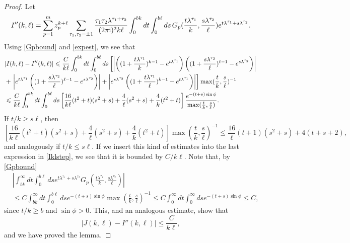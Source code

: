\documentclass{article}
\numberwithin{equation}{section}
\numberwithin{figure}{section}
\theoremstyle{plain}
\theoremstyle{plain}
\numberwithin{thm}{section}
\theoremstyle{remark}
\newcommand{\I}{{\rm i}}
\let \le \leqslant
\let \ge \geqslant
\begin{document}
\begin{proof}
Let
\begin{equation*}
I''(k,\ell)=\sum_{p=1}^m z_p^{k+\ell}\sum_{\tau_1,\tau_2=\pm 1}\frac{\tau_1\tau_2\lambda^{\tau_1+\tau_2}}{(2\pi\I)^2k\ell}\int_0^{bk}dt\int_0^{b\ell}ds\,
G_p(\frac {t\lambda^{\tau_1}}k,\frac {s\lambda^{\tau_2}}\ell)e^{t\lambda^{\tau_1}+s\lambda^{\tau_2}}.
\end{equation*}
Using \eqref{Gpbound} and \eqref{expest}, we see that
\begin{align}\label{Iklstep}
&|I(k,\ell)-I''(k,\ell)|\le\frac{C}{k\ell}\int_0^{bk}dt\int_0^{b\ell}ds\left[\left|\left((1+\frac {t\lambda^{\tau_1}}k)^{k-1}-e^{t\lambda^{\tau_1}}\right)
\left((1+\frac {s\lambda^{\tau_2}}\ell)^{\ell-1}-e^{s\lambda^{\tau_2}}\right)\right|\right.\notag\\
&+\left.\left|e^{t\lambda^{\tau_1}}\left((1+\frac {s\lambda^{\tau_2}}\ell)^{\ell-1}-e^{s\lambda^{\tau_2}}\right)\right|
+\left|e^{s\lambda^{\tau_2}}\left((1+\frac {t\lambda^{\tau_1}}\ell)^{k-1}-e^{t\lambda^{\tau_1}}\right)\right|\right]\max(\frac tk,\frac s\ell)^{-1}\notag\\
&\le\frac{C}{k\ell}\int_0^{bk}dt\int_0^{b\ell}ds\left[\frac {16}{k\ell}(t^2+t)(s^2+s)+\frac 4\ell(s^2+s)+\frac 4k(t^2+t)\right]\frac{e^{-(t+s)\sin\phi}}{\max(\frac tk,\frac s\ell)}.
\end{align}
If $t/k\ge s\ell$, then
\begin{equation*}
\left[\frac {16}{k\ell}(t^2+t)(s^2+s)+\frac 4\ell(s^2+s)+\frac 4k(t^2+t)\right]\max(\frac tk,\frac s\ell)^{-1}\le \frac {16}\ell(t+1)(s^2+s)+4(t+s+2),
\end{equation*}
and analogously if $t/k\le s\ell$. If we insert this kind of estimates into the last expression in \eqref{Iklstep}, we see that it is bounded by $C/k\ell$. Note that, by \eqref{Gpbound}
\begin{align*}
&\left|\int_{bk}^\infty dt\int_0^{b\ell}ds e^{t\lambda^{\tau_1}+s\lambda^{\tau_2}}G_p(\frac {t\lambda^{\tau_1}}k,\frac {s\lambda^{\tau_2}}\ell)\right|\\
&\le C\int_{bk}^\infty dt\int_0^{b\ell}ds e^{-(t+s)\sin\phi}\max(\frac tk,\frac s\ell)^{-1}\le C\int_0^\infty dt\int_0^\infty ds e^{-(t+s)\sin\phi}\le C,
\end{align*}
since $t/k\ge b$ and $\sin\phi>0$. This, and an analogous estimate, show that
\begin{equation*}
|J(k,\ell)-I''(k,\ell)|\le\frac{C}{k\ell},
\end{equation*}
and we have proved the lemma.
\end{proof}
\end{document}

